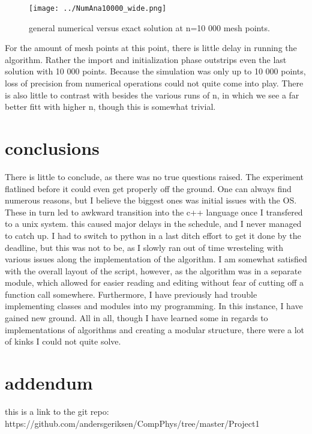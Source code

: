 \documentclass[10pt,showpacs,preprintnumbers,footinbib,amsmath,amssymb,aps,prl,twocolumn,groupedaddress,superscriptaddress,showkeys]{revtex4-1}
\begin{document}
\begin{figure}[hbtp]
\texttt{[image: ../NumAna10000\_wide.png]}
\caption{general numerical versus exact solution at n=10 000 mesh points.} 
\label{fig:n10points}
\end{figure}
For the amount of mesh points at this point, there is little delay in running the algorithm. Rather the import and initialization phase outstrips even the last solution with 10 000 points. Because the simulation was only up to 10 000 points, loss of precision from numerical operations could not quite come into play. There is also little to contrast with besides the various runs of n, in which we see a far better fitt with higher n, though this is somewhat trivial. 

\section{conclusions}
There is little to conclude, as there was no true questions raised. The experiment flatlined before it could even get properly off the ground. One can always find numerous reasons, but I believe the biggest ones was initial issues with the OS. These in turn led to awkward transition into the c++ language once I transfered to a unix system. this caused major delays in the schedule, and I never managed to catch up. I had to switch to python in a last ditch effort to get it done by the deadline, but this was not to be, as I slowly ran out of time wresteling with various issues along the implementation of the algorithm. I am somewhat satisfied with the overall layout of the script, however, as the algorithm was in a separate module, which allowed for easier reading and editing without fear of cutting off a function call somewhere. Furthermore, I have previously had trouble implementing classes and modules into my programming. In this instance, I have gained new ground. All in all, though I have learned some in regards to implementations of algorithms and creating a modular structure, there were a lot of kinks I could not quite solve. 

\section{addendum}
this is a link to the git repo:
https://github.com/andersgeriksen/CompPhys/tree/master/Project1
\end{document}
